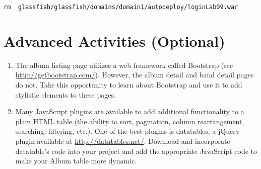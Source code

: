 \documentclass[12pt]{scrartcl}
\begin{document}
\texttt{rm ~glassfish/glassfish/domains/domain1/autodeploy/loginLab09.war}

\section*{Advanced Activities (Optional)}

\begin{enumerate}
  \item The album listing page utilizes a web framework called Bootstrap
  	(see \url{http://getbootstrap.com/}).  However, the album detail and 
	band detail pages do not.  Take this opportunity to learn about 
	Bootstrap and use it to add stylistic elements to these pages.
  \item Many JavaScript plugins are available to add additional 
    functionality to a plain HTML table (the ability to sort, pagination,
    column rearrangement, searching, filtering, etc.).  One of the best 
    plugins is datatables, a jQuery plugin available at 
    \url{http://datatables.net/}.  Download and incorporate datatable's 
    code into your project and add the appropriate JavaScript code 
    to make your Album table more dynamic.
\end{enumerate}
\end{document}

